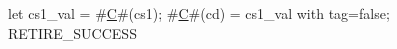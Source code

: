 let cs1_val = #\hyperref[sailRISCVzC]{C}#(cs1);
#\hyperref[sailRISCVzC]{C}#(cd) = {cs1_val with tag=false};
RETIRE_SUCCESS
